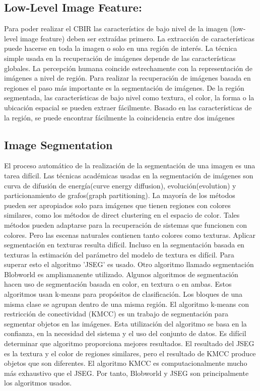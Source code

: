 \documentclass{llncs}
\begin{document}
\subsection{Low-Level Image Feature:}

Para poder realizar el CBIR las caracter\'istics de bajo nivel de la imagen  (low-level image feature) deben ser extra\'idas 
primero. La extracci\'on de caracter\'isticas puede hacerse en toda la imagen o solo en una regi\'on de inter\'es. La t\'ecnica
simple usada en la recuperaci\'on de im\'agenes depende de las caracter\'isticas globales. La percepci\'on humana coincide 
estrechamente con la representaci\'on de im\'agenes a nivel de regi\'on. Para realizar la recuperaci\'on de im\'agenes 
basada en regiones el paso m\'as importante es la segmentaci\'on de im\'agenes. De la regi\'on segmentada, las caracter\'isticas 
de bajo nivel como textura, el color, la forma o la ubicaci\'on espacial se pueden extraer f\'acilmente. Basado en las caracter\'isticas
de la regi\'on, se puede encontrar f\'acilmente la coincidencia entre dos im\'agenes 

\subsection{ Image Segmentation}
El proceso autom\'atico de la realizaci\'on de la segmentaci\'on de una imagen es una tarea dif\'icil. Las t\'ecnicas acad\'emicas 
usadas en la segmentaci\'on de im\'agenes son curva de difusi\'on de energ\'ia(curve energy diffusion), evoluci\'on(evolution) y particionamiento 
de grafos(graph partitioning). La mayor\'ia de los m\'etodos pueden ser apropiados solo para im\'agenes que tienen regiones con colores
similares, como los m\'etodos de direct clustering en el espacio de color. Tales m\'etodos pueden adaptarse para la recuperaci\'on de sistemas 
que funcionen con colores. Pero las escenas naturales contienen tanto colores como texturas. Aplicar segmentaci\'on en texturas resulta 
dif\'icil. Incluso en la segmentaci\'on basada en texturas la estimaci\'on del par\'ametro del modelo de textura es dif\'icil. Para 
superar esto el algoritmo 'JSEG' es usado. Otro algoritmo llamado segmentaci\'on Blobworld es ampliamanente utilizado. Algunos algoritmos 
de segmentaci\'on hacen uso de segmentaci\'on basada en color, en textura o en ambas. Estos algoritmos usan k-means para prop\'ositos de 
clasificaci\'on. Los bloques de una misma clase se agrupan dentro de una misma regi\'on. El algoritmo k-means con restricci\'on de 
conectividad (KMCC) es un trabajo de segmentaci\'on para segmentar objetos en las im\'agenes. Esta utilizaci\'on del algoritmo  se basa 
en la confianza, en la necesidad del sistema y el uso del conjunto de datos. Es dif\'icil determinar que algoritmo proporciona mejores 
resultados. El resultado del JSEG es la textura y el color de regiones similares, pero el resultado de KMCC produce objetos que son diferentes.
El algoritmo KMCC es computacionalmente mucho m\'as exhaustivo que el JSEG. Por tanto, Blobworld y JSEG son principalmente los algoritmos usados.
\end{document}
